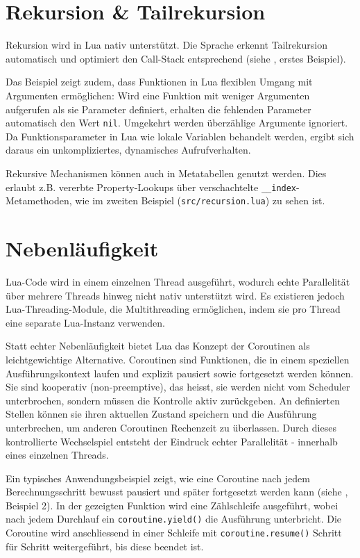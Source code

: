 \documentclass[11pt,a4paper]{article}
\begin{document}
\section*{Rekursion \& Tailrekursion}

Rekursion wird in Lua nativ unterstützt. Die Sprache erkennt Tailrekursion automatisch und optimiert den Call-Stack entsprechend (siehe , erstes Beispiel).

Das Beispiel zeigt zudem, dass Funktionen in Lua flexiblen Umgang mit Argumenten ermöglichen: 
Wird eine Funktion mit weniger Argumenten aufgerufen als sie Parameter definiert, erhalten die fehlenden Parameter automatisch den Wert \texttt{nil}. 
Umgekehrt werden überzählige Argumente ignoriert. 
Da Funktionsparameter in Lua wie lokale Variablen behandelt werden, ergibt sich daraus ein unkompliziertes, dynamisches Aufrufverhalten.

Rekursive Mechanismen können auch in Metatabellen genutzt werden. 
Dies erlaubt z.B. vererbte Property-Lookups über verschachtelte \texttt{\_\_index}-Metamethoden, wie im zweiten Beispiel (\texttt{src/recursion.lua}) zu sehen ist.

\section*{Nebenläufigkeit}

Lua-Code wird in einem einzelnen Thread ausgeführt, wodurch echte Parallelität über mehrere Threads hinweg nicht nativ unterstützt wird. 
Es existieren jedoch Lua-Threading-Module, die Multithreading ermöglichen, indem sie pro Thread eine separate Lua-Instanz verwenden.

Statt echter Nebenläufigkeit bietet Lua das Konzept der Coroutinen als leichtgewichtige Alternative. 
Coroutinen sind Funktionen, die in einem speziellen Ausführungskontext laufen und explizit pausiert sowie fortgesetzt werden können. 
Sie sind kooperativ (non-preemptive), das heisst, sie werden nicht vom Scheduler unterbrochen, sondern müssen die Kontrolle aktiv zurückgeben. 
An definierten Stellen können sie ihren aktuellen Zustand speichern und die Ausführung unterbrechen, um anderen Coroutinen Rechenzeit zu überlassen. 
Durch dieses kontrollierte Wechselspiel entsteht der Eindruck echter Parallelität - innerhalb eines einzelnen Threads.

Ein typisches Anwendungsbeispiel zeigt, wie eine Coroutine nach jedem Berechnungsschritt bewusst pausiert und später fortgesetzt werden kann (siehe , Beispiel 2). 
In der gezeigten Funktion wird eine Zählschleife ausgeführt, wobei nach jedem Durchlauf ein \lstinline|coroutine.yield()| die Ausführung unterbricht. 
Die Coroutine wird anschliessend in einer Schleife mit \lstinline|coroutine.resume()| Schritt für Schritt weitergeführt, bis diese beendet ist.
\end{document}
